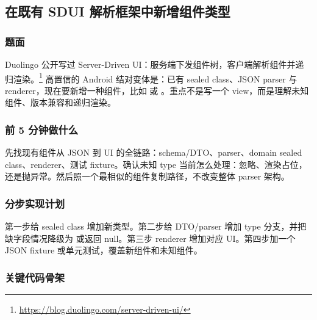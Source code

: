 \subsection{在既有 SDUI 解析框架中新增组件类型}

\subsubsection*{题面}

Duolingo 公开写过 Server-Driven UI：服务端下发组件树，客户端解析组件并递归渲染。\srcinferred\footnote{\url{https://blog.duolingo.com/server-driven-ui/}} 高置信的 Android 结对变体是：已有  sealed class、JSON parser 与 renderer，现在要新增一种组件，比如  或 。重点不是写一个 view，而是理解未知组件、版本兼容和递归渲染。

\subsubsection*{前 5 分钟做什么}

先找现有组件从 JSON 到 UI 的全链路：schema/DTO、parser、domain sealed class、renderer、测试 fixture。确认未知 type 当前怎么处理：忽略、渲染占位，还是抛异常。然后照一个最相似的组件复制路径，不改变整体 parser 架构。

\subsubsection*{分步实现计划}

第一步给 sealed class 增加新类型。第二步给 DTO/parser 增加 type 分支，并把缺字段情况降级为  或返回 null。第三步 renderer 增加对应 UI。第四步加一个 JSON fixture 或单元测试，覆盖新组件和未知组件。

\subsubsection*{关键代码骨架}

